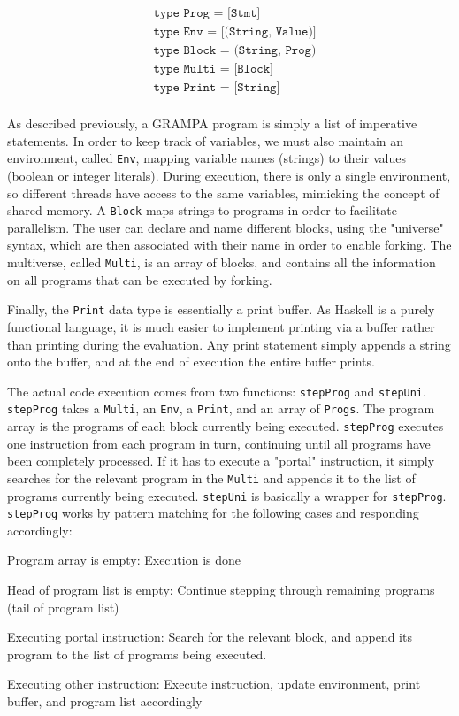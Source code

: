 \documentclass[numbers]{sigplanconf}
\begin{document}
\begin{align*}
	&\texttt{type Prog = [Stmt]} \\
	&\texttt{type Env = [(String, Value)]} \\
	&\texttt{type Block = (String, Prog)} \\
	&\texttt{type Multi = [Block]} \\
	&\texttt{type Print = [String]} \\
\end{align*}

As described previously, a GRAMPA program is simply a list of imperative statements. In order to keep track of variables, we must also maintain an environment, called \texttt{Env}, mapping variable names (strings) to their values (boolean or integer literals). During execution, there is only a single environment, so different threads have access to the same variables, mimicking the concept of shared memory. A \texttt{Block} maps strings to programs in order to facilitate parallelism. The user can declare and name different blocks, using the "universe" syntax, which are then associated with their name in order to enable forking. The multiverse, called \texttt{Multi}, is an array of blocks, and contains all the information on all programs that can be executed by forking. 

Finally, the \texttt{Print} data type is essentially a print buffer. As Haskell is a purely functional language, it is much easier to implement printing via a buffer rather than printing during the evaluation. Any print statement simply appends a string onto the buffer, and at the end of execution the entire buffer prints.

The actual code execution comes from two functions: \texttt{stepProg} and \texttt{stepUni}. \texttt{stepProg} takes a \texttt{Multi}, an \texttt{Env}, a \texttt{Print}, and an array of \texttt{Progs}. The program array is the programs of each block currently being executed. \texttt{stepProg} executes one instruction from each program in turn, continuing until all programs have been completely processed. If it has to execute a "portal" instruction, it simply searches for the relevant program in the \texttt{Multi} and appends it to the list of programs currently being executed. \texttt{stepUni} is basically a wrapper for \texttt{stepProg}. \texttt{stepProg} works by pattern matching for the following cases and responding accordingly:
\begin{description}
	\item{Program array is empty: } Execution is done
	\item{Head of program list is empty: } Continue stepping through remaining programs (tail of program list)
	\item{Executing portal instruction: } Search for the relevant block, and append its program to the list of programs being executed.
	\item{Executing other instruction: } Execute instruction, update environment, print buffer, and program list accordingly
\end{description}
\end{document}
